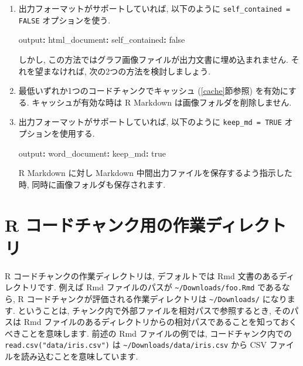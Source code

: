 \documentclass[
  11pt,
  lualatex,ja=standard,jafont=noto]{bxjsreport}
\newenvironment{Shaded}{\begin{snugshade}}{\end{snugshade}}
\newcommand{\AttributeTok}[1]{\textcolor[rgb]{0.77,0.63,0.00}{#1}}
\newcommand{\CharTok}[1]{\textcolor[rgb]{0.31,0.60,0.02}{#1}}
\newcommand{\FunctionTok}[1]{\textcolor[rgb]{0.00,0.00,0.00}{#1}}
\newcommand{\KeywordTok}[1]{\textcolor[rgb]{0.13,0.29,0.53}{\textbf{#1}}}
\begin{document}
\begin{enumerate}
\def\labelenumi{\arabic{enumi}.}
\item
  出力フォーマットがサポートしていれば, 以下のように \texttt{self\_contained = FALSE} オプションを使う.

\begin{Shaded}
\begin{Highlighting}[]
\FunctionTok{output}\KeywordTok{:}
\AttributeTok{  }\FunctionTok{html\_document}\KeywordTok{:}
\AttributeTok{    }\FunctionTok{self\_contained}\KeywordTok{:}\AttributeTok{ }\CharTok{false}
\end{Highlighting}
\end{Shaded}

  しかし, この方法ではグラフ画像ファイルが出力文書に埋め込まれません. それを望まなければ, 次の2つの方法を検討しましょう.
\item
  最低いずれか1つのコードチャンクでキャッシュ (\ref{cache}節参照) を有効にする. キャッシュが有効な時は R Markdown は画像フォルダを削除しません.
\item
  出力フォーマットがサポートしていれば, 以下のように \texttt{keep\_md = TRUE} オプションを使用する.

\begin{Shaded}
\begin{Highlighting}[]
\FunctionTok{output}\KeywordTok{:}
\AttributeTok{  }\FunctionTok{word\_document}\KeywordTok{:}
\AttributeTok{    }\FunctionTok{keep\_md}\KeywordTok{:}\AttributeTok{ }\CharTok{true}
\end{Highlighting}
\end{Shaded}

  R Markdown に対し Markdown 中間出力ファイルを保存するよう指示した時, 同時に画像フォルダも保存されます.
\end{enumerate}

\hypertarget{working-directory}{%
\section{R コードチャンク用の作業ディレクトリ}\label{working-directory}}

R コードチャンクの作業ディレクトリは, デフォルトでは Rmd 文書のあるディレクトリです. 例えば Rmd ファイルのパスが \texttt{\textasciitilde{}/Downloads/foo.Rmd} であるなら, R コードチャンクが評価される作業ディレクトリは \texttt{\textasciitilde{}/Downloads/} になります. ということは, チャンク内で外部ファイルを相対パスで参照するとき, そのパスは Rmd ファイルのあるディレクトリからの相対パスであることを知っておくべきことを意味します. 前述の Rmd ファイルの例では, コードチャンク内での \texttt{read.csv("data/iris.csv")} は \texttt{\textasciitilde{}/Downloads/data/iris.csv} から CSV ファイルを読み込むことを意味しています.
\end{document}

